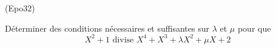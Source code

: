 \begin{tiny}(Epo32)\end{tiny} Déterminer des conditions nécessaires et suffisantes sur $\lambda$ et $\mu$ pour que 
\begin{displaymath}
 X^2+1 \text{ divise } X^4+X^3+\lambda X^2 + \mu X +2
\end{displaymath}
 